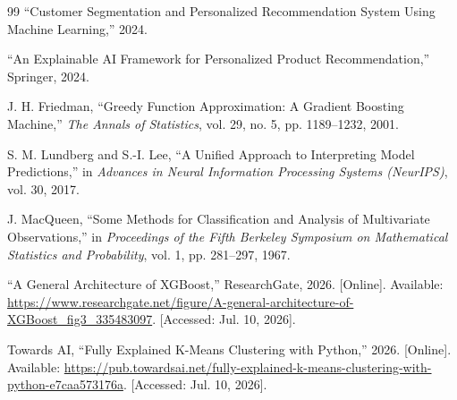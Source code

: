 \documentclass[12pt, a4paper]{report}
\numberwithin{figure}{chapter}
\numberwithin{table}{chapter}
\numberwithin{equation}{chapter}
\begin{document}
\begin{thebibliography}{99}
``Customer Segmentation and Personalized Recommendation System Using Machine Learning,'' 2024.

``An Explainable AI Framework for Personalized Product Recommendation,'' Springer, 2024.

J. H. Friedman, ``Greedy Function Approximation: A Gradient Boosting Machine,'' \emph{The Annals of Statistics}, vol. 29, no. 5, pp. 1189--1232, 2001.

S. M. Lundberg and S.-I. Lee, ``A Unified Approach to Interpreting Model Predictions,'' in \emph{Advances in Neural Information Processing Systems (NeurIPS)}, vol. 30, 2017.

J. MacQueen, ``Some Methods for Classification and Analysis of Multivariate Observations,'' in \emph{Proceedings of the Fifth Berkeley Symposium on Mathematical Statistics and Probability}, vol. 1, pp. 281--297, 1967.

``A General Architecture of XGBoost,'' ResearchGate, 2026. [Online]. Available: \url{https://www.researchgate.net/figure/A-general-architecture-of-XGBoost_fig3_335483097}. [Accessed: Jul. 10, 2026].

Towards AI, ``Fully Explained K-Means Clustering with Python,'' 2026. [Online]. Available: \url{https://pub.towardsai.net/fully-explained-k-means-clustering-with-python-e7caa573176a}. [Accessed: Jul. 10, 2026].

\end{thebibliography}
\end{document}
